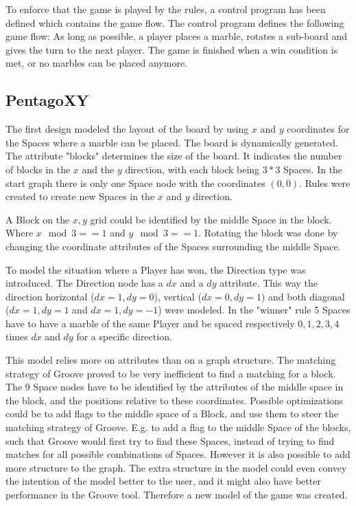 To enforce that the game is played by the rules, a control program has been defined which contains the game flow.
The control program defines the following game flow: As long as possible, a player places a marble, rotates a sub-board and gives the turn to the next player.
The game is finished when a win condition is met, or no marbles can be placed anymore.

\subsection{PentagoXY}
\label{pentagoxy}

The first design modeled the layout of the board by using $x$ and $y$ coordinates for the Spaces where a marble can be placed. 
The board is dynamically generated. The attribute "blocks" determines the size of the board. It indicates the number of blocks in the $x$ and the $y$ direction, with each block being $3*3$ Spaces.
In the start graph there is only one Space node with the coordinates $(0,0)$. Rules were created to create new Spaces in the $x$ and $y$ direction.

A Block on the $x,y$ grid could be identified by the middle Space in the block. Where $x\mod3==1$ and $y\mod3==1$.
Rotating the block was done by changing the coordinate attributes of the Spaces surrounding the middle Space.

\vspace{6pt}

To model the situation where a Player has won, the Direction type was introduced. The Direction node has a $dx$ and a $dy$ attribute.
This way the direction horizontal ($dx=1,dy=0$), vertical ($dx=0,dy=1$) and both diagonal ($dx=1,dy=1$ and $dx=1,dy=-1$) were modeled. 
In the "winner" rule 5 Spaces have to have a marble of the same Player and be spaced respectively $0,1,2,3,4$ times $dx$ and $dy$ for a specific direction.

\vspace{6pt}

This model relies more on attributes than on a graph structure.
The matching strategy of Groove proved to be very inefficient to find a matching for a block. The 9 Space nodes have to be identified by the attributes of the middle space in the block, and the positions relative to these coordinates.
Possible optimizations could be to add flags to the middle space of a Block, and use them to steer the matching strategy of Groove. E.g. to add a flag to the middle Space of the blocks, such that Groove would first try to find these Spaces, instead of trying to find matches for all possible combinations of Spaces.
However it is also possible to add more structure to the graph. 
The extra structure in the model could even convey the intention of the model better to the user, and it might also have better performance in the Groove tool. Therefore a new model of the game was created.

